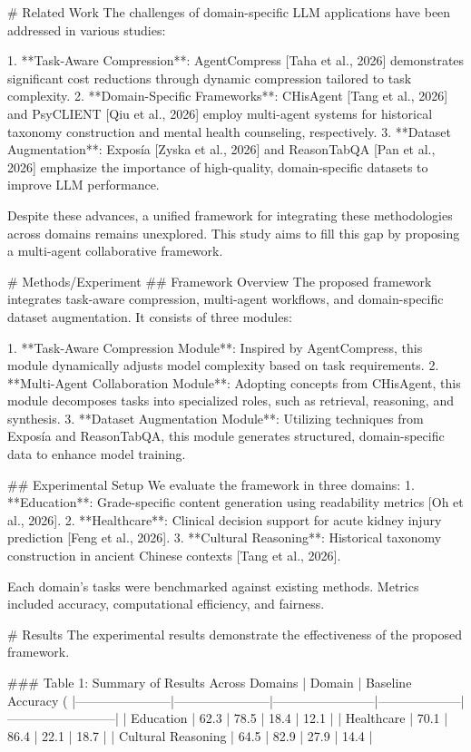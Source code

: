# Related Work  
The challenges of domain-specific LLM applications have been addressed in various studies:  

1. **Task-Aware Compression**: AgentCompress [Taha et al., 2026] demonstrates significant cost reductions through dynamic compression tailored to task complexity.  
2. **Domain-Specific Frameworks**: CHisAgent [Tang et al., 2026] and PsyCLIENT [Qiu et al., 2026] employ multi-agent systems for historical taxonomy construction and mental health counseling, respectively.  
3. **Dataset Augmentation**: Exposía [Zyska et al., 2026] and ReasonTabQA [Pan et al., 2026] emphasize the importance of high-quality, domain-specific datasets to improve LLM performance.  

Despite these advances, a unified framework for integrating these methodologies across domains remains unexplored. This study aims to fill this gap by proposing a multi-agent collaborative framework.

# Methods/Experiment  
## Framework Overview  
The proposed framework integrates task-aware compression, multi-agent workflows, and domain-specific dataset augmentation. It consists of three modules:  

1. **Task-Aware Compression Module**: Inspired by AgentCompress, this module dynamically adjusts model complexity based on task requirements.  
2. **Multi-Agent Collaboration Module**: Adopting concepts from CHisAgent, this module decomposes tasks into specialized roles, such as retrieval, reasoning, and synthesis.  
3. **Dataset Augmentation Module**: Utilizing techniques from Exposía and ReasonTabQA, this module generates structured, domain-specific data to enhance model training.  

## Experimental Setup  
We evaluate the framework in three domains:  
1. **Education**: Grade-specific content generation using readability metrics [Oh et al., 2026].  
2. **Healthcare**: Clinical decision support for acute kidney injury prediction [Feng et al., 2026].  
3. **Cultural Reasoning**: Historical taxonomy construction in ancient Chinese contexts [Tang et al., 2026].  

Each domain's tasks were benchmarked against existing methods. Metrics included accuracy, computational efficiency, and fairness.

# Results  
The experimental results demonstrate the effectiveness of the proposed framework.  

### Table 1: Summary of Results Across Domains  
| Domain                | Baseline Accuracy (%
|-----------------------|-----------------------|------------------------|--------------------|--------------------------|  
| Education             | 62.3                 | 78.5                   | 18.4               | 12.1                     |  
| Healthcare            | 70.1                 | 86.4                   | 22.1               | 18.7                     |  
| Cultural Reasoning    | 64.5                 | 82.9                   | 27.9               | 14.4                     |  

